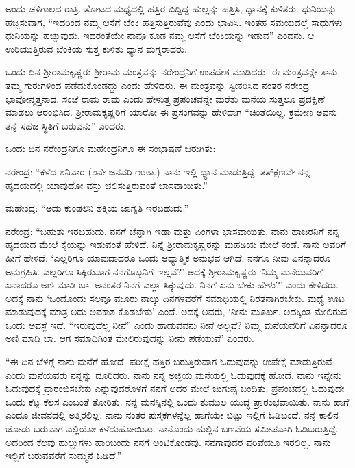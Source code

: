 ಅಂದು ಚಳಿಗಾಲದ ರಾತ್ರಿ. ತೋಟದ ಮಧ್ಯದಲ್ಲಿ ಹತ್ತಿರ ಬಿದ್ದಿದ್ದ ಹುಲ್ಲನ್ನು ಹತ್ತಿಸಿ, ಧ್ಯಾನಕ್ಕೆ ಕುಳಿತರು. ಧುನಿಯನ್ನು ಹಚ್ಚಿಸುವಾಗ, “ಇದರಿಂದ ನಮ್ಮ ಆಸೆಗೆ ಬೆಂಕಿ ಹತ್ತಿಸುತ್ತಿರುವೆವು ಎಂದು ಭಾವಿಸಿ. ಇಂತಹ ಸಮಯದಲ್ಲೆ ಸಾಧುಗಳು ಧುನಿಯನ್ನು ಹಚ್ಚುವುದು. ಇದರಂತೆಯೇ ನಾವೂ ಕೂಡ ನಮ್ಮ ಆಸೆಗೆ ಬೆಂಕಿಯನ್ನು ಇಡುವ” ಎಂದನು. ಆ ಉರಿಯುತ್ತಿರುವ ಬೆಂಕಿಯ ಸುತ್ತ ಕುಳಿತು ಧ್ಯಾನ ಮಗ್ನರಾದರು.

ಒಂದು ದಿನ ಶ‍್ರೀರಾಮಕೃಷ್ಣರು ಶ‍್ರೀರಾಮ ಮಂತ್ರವನ್ನು ನರೇಂದ್ರನಿಗೆ ಉಪದೇಶ ಮಾಡಿದರು. ಈ ಮಂತ್ರವನ್ನೇ ತಾನು ತಮ್ಮ ಗುರುಗಳಿಂದ ಪಡೆದುಕೊಂಡದ್ದು ಎಂದು ಹೇಳಿದರು. ಈ ಮಂತ್ರವನ್ನು ಸ್ವೀಕರಿಸಿದ ನಂತರ ನರೇಂದ್ರ ಭಾವೋನ್ಮತ್ತನಾದ. ಸಂಜೆ ರಾಮ ರಾಮ ಎಂದು ಹೇಳುತ್ತ ಪ್ರಪಂಚವನ್ನೇ ಮರೆತು ಮನೆಯ ಸುತ್ತಲೂ ಪ್ರದಕ್ಷಿಣೆ ಮಾಡಲು ಆರಂಭಿಸಿದ. ಶ‍್ರೀರಾಮಕೃಷ್ಣರಿಗೆ ಯಾರೋ ಈ ಪ್ರಸಂಗವನ್ನು ಹೇಳಿದಾಗ “ಚಿಂತೆಯಿಲ್ಲ. ಕ್ರಮೇಣ ಅವನು ತನ್ನ ಸಹಜ ಸ್ಥಿತಿಗೆ ಬರುವನು” ಎಂದರು.

ಒಂದು ದಿನ ನರೇಂದ್ರನಿಗೂ ಮಹೇಂದ್ರನಿಗೂ ಈ ಸಂಭಾಷಣೆ ಜರುಗಿತು:

ನರೇಂದ್ರ: “ಕಳೆದ ಶನಿವಾರ (೨ನೇ ಜನವರಿ ೧೮೮೬) ನಾನು ಇಲ್ಲಿ ಧ್ಯಾನ ಮಾಡುತ್ತಿದ್ದೆ. ತತ್‍ಕ್ಷಣವೇ ನನ್ನ ಹೃದಯದಲ್ಲಿ ಯಾವುದೋ ವಸ್ತು ಚಲಿಸುತ್ತಿರುವಂತೆ ಭಾಸವಾಯಿತು.”

ಮಹೇಂದ್ರ: “ಅದು ಕುಂಡಲಿನಿ ಶಕ್ತಿಯ ಜಾಗೃತಿ ಇರಬಹುದು.”

ನರೇಂದ್ರ: “ಬಹುಶಃ ಇರಬಹುದು. ನನಗೆ ಚೆನ್ನಾಗಿ ಇಡಾ ಮತ್ತು ಪಿಂಗಳಾ ಭಾಸವಾಯಿತು. ನಾನು ಹಾಜರನಿಗೆ ನನ್ನ ಹೃದಯದ ಮೇಲೆ ಕೈಯನ್ನು ಇಡುವಂತೆ ಹೇಳಿದೆ. ನಿನ್ನೆ ಶ‍್ರೀರಾಮಕೃಷ್ಣರನ್ನು ಮಹಡಿಯ ಮೇಲೆ ಕಂಡೆ. ನಾನು ಅವರಿಗೆ ಹೀಗೆ ಹೇಳಿದೆ: ‘ಎಲ್ಲರಿಗೂ ಯಾವುದಾದರೂ ಒಂದು ಆಧ್ಯಾತ್ಮಿಕ ಅನುಭವ ಆಗಿದೆ. ನನಗೂ ನೀವು ಏನನ್ನಾದರೂ ಅನುಗ್ರಹಿಸಿ. ಎಲ್ಲರಿಗೂ ಸಿಕ್ಕಿರುವಾಗ ನನಗೊಬ್ಬನಿಗೆ ಇಲ್ಲವೆ?’ ಅದಕ್ಕೆ ಶ‍್ರೀರಾಮಕೃಷ್ಣರು ‘ನಿಮ್ಮ ಮನೆಯವರಿಗೆ ಏನಾದರೂ ಅಣಿ ಮಾಡಿ ಬಾ. ಅನಂತರ ನಿನಗೆ ಎಲ್ಲಾ ಸಿಕ್ಕುವುದು. ನಿನಗೆ ಏನು ಬೇಕು ಹೇಳು?’ ಎಂದು ಕೇಳಿದರು. ಅದಕ್ಕೆ ನಾನು ‘ಒಂದೊಂದು ಸಲವೂ ಮೂರು ನಾಲ್ಕು ದಿನಗಳವರೆಗೆ ಸಮಾಧಿಯಲ್ಲಿ ನಿರತನಾಗಿರಬೇಕು. ಮಧ್ಯೆ ಊಟ ಮಾಡುವುದಕ್ಕೆ ಮಾತ್ರ ಅದು ಅವಕಾಶ ಕೊಡಬೇಕು’ ಎಂದೆ. ಅದಕ್ಕೆ ಅವರು, ‘ನೀನು ಮೂರ್ಖ. ಅದಕ್ಕಿಂತ ಮೇಲಿರುವ ಒಂದು ಅವಸ್ಥೆ ಇದೆ. “ಇರುವುದೆಲ್ಲ ನೀನೆ” ಎಂದು ಹಾಡುವವನು ನೀನೆ ಅಲ್ಲವೆ? ನಿಮ್ಮ ಮನೆಯವರಿಗೆ ಏನನ್ನಾದರೂ ಅಣಿ ಮಾಡಿ ಬಾ. ಆಗ ಸಮಾಧಿಗಿಂತ ಮೇಲಿರುವುದನ್ನು ನೀನು ಪಡೆಯುವೆ’ ಎಂದರು.

“ಈ ದಿನ ಬೆಳಗ್ಗೆ ನಾನು ಮನೆಗೆ ಹೋದೆ. ಪರೀಕ್ಷೆ ಹತ್ತಿರ ಬರುತ್ತಿರುವಾಗ ಓದುವುದನ್ನು ಉಪೇಕ್ಷೆ ಮಾಡುತ್ತಿರುವೆ ಎಂದು ಮನೆಯವರು ನನ್ನನ್ನು ದೂರಿದರು. ನಾನು ನನ್ನ ಅಜ್ಜಿಯ ಮನೆಯಲ್ಲಿ ಓದುವುದಕ್ಕೆ ಹೋದೆ. ನಾನು ಇನ್ನೇನು ಓದುವುದಕ್ಕೆ ಪ್ರಾರಂಭಿಸಬೇಕು ಎನ್ನುವುದರೊಳಗೆ ನನಗೆ ಅದರ ಮೇಲೆ ಜುಗುಪ್ಸೆ ಬಂದಿತು. ಪ್ರಪಂಚದಲ್ಲಿ ಓದುವುದೇ ಒಂದು ಕೆಟ್ಟ ಕೆಲಸ ಎಂಬಂತೆ ತೋರಿತು. ನನ್ನ ಮನಸ್ಸಿನಲ್ಲಿ ಒಂದು ತುಮುಲ ಯುದ್ಧ ಪ್ರಾರಂಭವಾಯಿತು. ನಾನು ಹಾಗೆ ಎಂದೂ ಜೀವನದಲ್ಲಿ ಅತ್ತಿರಲಿಲ್ಲ. ನಾನು ನಂತರ ಪುಸ್ತಕಗಳನ್ನೆಲ್ಲ ಹಾಗೆಯೇ ಬಿಟ್ಟು ಇಲ್ಲಿಗೆ ಓಡಿಬಂದೆ. ನನ್ನ ಕಾಲಿನ ಜೋಡು ಬರುವಾಗ ಎಲ್ಲಿಯೋ ಕಳೆದುಹೋಯಿತು. ನಾನೊಂದು ಹುಲ್ಲಿನ ಬಣವೆಯ ಸಮೀಪವಾಗಿ ಓಡಿಬರುತ್ತಿದ್ದೆ. ಅದರಿಂದ ಕೆಲವು ಹುಲ್ಲುಗಳು ಹಾರಿಬಂದು ನನಗೆ ಅಂಟಿಕೊಂಡವು. ನನಗಾವುದರ ಪರಿವೆಯೂ ಇರಲಿಲ್ಲ. ನಾನು ಇಲ್ಲಿಗೆ ಬರುವವರೆಗೆ ಸುಮ್ಮನೆ ಓಡಿದೆ.”

